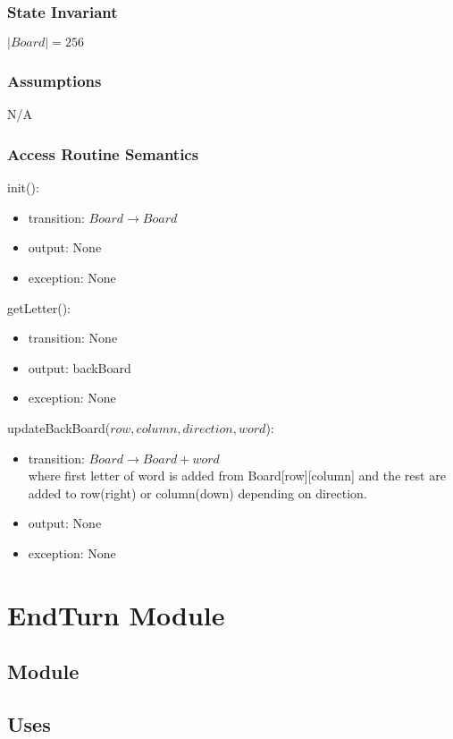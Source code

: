 \documentclass[12pt]{article}
\begin{document}
\subsubsection* {State Invariant}
$|Board| = 256$
\subsubsection* {Assumptions}

N/A

\subsubsection* {Access Routine Semantics}

\noindent init():
\begin{itemize}
\item transition: $Board \rightarrow Board$ 
\item output: None
\item exception: None
\end{itemize}

\noindent getLetter():
\begin{itemize}
\item transition: None
\item output: backBoard
\item exception: None
\end{itemize}

\noindent updateBackBoard($row, column, direction, word$):
\begin{itemize}
\item transition: $Board \rightarrow Board + word$ \\
where first letter of word is added from Board[row][column] and the rest are added to row(right) or column(down) depending on direction.
\item output: None
\item exception: None
\end{itemize}

\newpage

\section* {EndTurn Module}

\subsection*{Module}

\subsection* {Uses}
\end{document}
